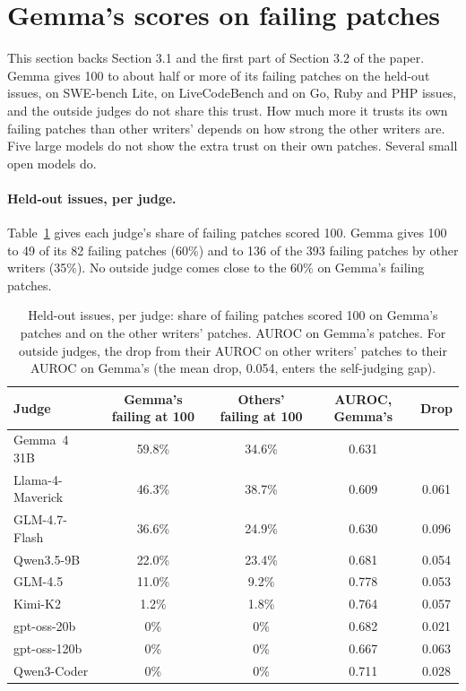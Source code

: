 \documentclass[10pt,letterpaper]{article}
\begin{document}
\section{Gemma's scores on failing patches}
\label{app:stamp}

This section backs Section 3.1 and the first part of Section 3.2 of the paper. Gemma gives 100 to about half or more
of its failing patches on the held-out issues, on SWE-bench Lite, on LiveCodeBench and on Go, Ruby and PHP issues, and
the outside judges do not share this trust. How much more it trusts its own failing patches than other writers'
depends on how strong the other writers are. Five large models do not show the extra trust on their own patches.
Several small open models do.

\paragraph{Held-out issues, per judge.} Table~\ref{tab:perjudge} gives each judge's share of failing patches scored
100. Gemma gives 100 to 49 of its 82 failing patches (60\%) and to 136 of the 393 failing patches by other writers
(35\%). No outside judge comes close to the 60\% on Gemma's failing patches.

\begin{table}[H]
\centering
\small
\caption{Held-out issues, per judge: share of failing patches scored 100 on Gemma's patches and on the other writers'
patches. AUROC on Gemma's patches. For outside judges, the drop from their AUROC on other writers' patches to
their AUROC on Gemma's (the mean drop, 0.054, enters the self-judging gap).}
\label{tab:perjudge}
\begin{tabular}{@{}lcccc@{}}
\toprule
Judge & Gemma's failing at 100 & Others' failing at 100 & AUROC, Gemma's & Drop \\
\midrule
Gemma~4 31B & 59.8\% & 34.6\% & 0.631 & \\
Llama-4-Maverick & 46.3\% & 38.7\% & 0.609 & 0.061 \\
GLM-4.7-Flash & 36.6\% & 24.9\% & 0.630 & 0.096 \\
Qwen3.5-9B & 22.0\% & 23.4\% & 0.681 & 0.054 \\
GLM-4.5 & 11.0\% & 9.2\% & 0.778 & 0.053 \\
Kimi-K2 & 1.2\% & 1.8\% & 0.764 & 0.057 \\
gpt-oss-20b & 0\% & 0\% & 0.682 & 0.021 \\
gpt-oss-120b & 0\% & 0\% & 0.667 & 0.063 \\
Qwen3-Coder & 0\% & 0\% & 0.711 & 0.028 \\
\bottomrule
\end{tabular}
\end{table}
\end{document}

